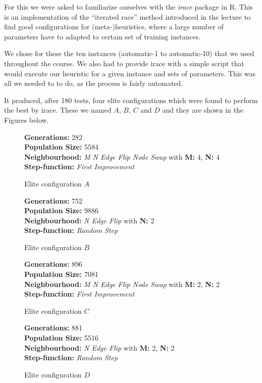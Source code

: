 \documentclass [11pt]{article}
\begin{document}
For this we were asked to familiarize ourselves with the \emph{irace} package in R. This is an implementation of the ``iterated race'' method introduced in the lecture to find good configurations for (meta-)heuristics, where a large number of parameters have to adapted to certain set of training instances. 

We chose for these the ten instances (automatic-1 to automatic-10) that we used throughout the course. We also had to provide irace with a simple script that would execute our heuristic for a given instance and sets of parameters. This was all we needed to to do, as the process is fairly automated. 

It produced, after 180 tests, four elite configurations which were found to perform the best by irace. These we  named $A$, $B$, $C$ and $D$ and they are shown in the Figures below. 


\begin{figure}[H]
  \textbf{Generations:} 282 \\
\textbf{Population Size:} 5584 \\
\textbf{Neighbourhood:} \emph{M N Edge Flip Node Swap} with \textbf{M:} 4, \textbf{N:} 4\\
\textbf{Step-function:} \emph{First Improvement} 
\caption{Elite configuration $A$}
\end{figure}


\begin{figure}[H]
  \textbf{Generations:} 752 \\
\textbf{Population Size:} 9886 \\
\textbf{Neighbourhood:} \emph{N Edge Flip } with \textbf{N:} 2\\
\textbf{Step-function:} \emph{Random Step} 
\caption{Elite configuration $B$}
\end{figure}



\begin{figure}[H]
  \textbf{Generations:} 896 \\
\textbf{Population Size:} 7081 \\
\textbf{Neighbourhood:} \emph{M N Edge Flip Node Swap} with \textbf{M:} 2, \textbf{N:} 2\\
\textbf{Step-function:} \emph{First Improvement} 
\caption{Elite configuration $C$}
\end{figure}


\begin{figure}[H]
  \textbf{Generations:} 881 \\
\textbf{Population Size:} 5516 \\
\textbf{Neighbourhood:} \emph{N Edge Flip} with \textbf{M:} 2, \textbf{N:} 2\\
\textbf{Step-function:} \emph{Random Step} 
\caption{Elite configuration $D$}
\end{figure}
\end{document}
